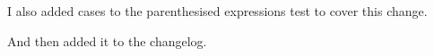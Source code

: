 \documentclass[../development.tex]{subfiles}
\begin{document}

I also added cases to the parenthesised expressions test to cover this change.


And then added it to the changelog.

\end{document}
